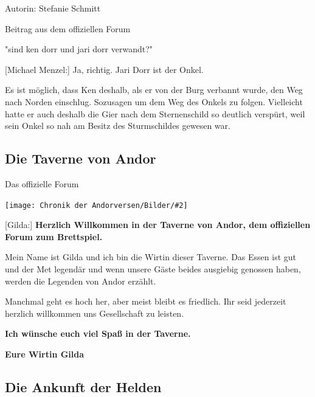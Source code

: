 \documentclass[10pt, a4paper, oneside]{book}
\newcommand{\produkt}[1]{%
    \section{#1}%
    \label{Produkt: #1}%
}
\newcommand{\bildmitts}[2][height=0.32\textwidth,width=0.48\textwidth,keepaspectratio]{%
    \begin{center}
        \texttt{[image: Chronik der Andorversen/Bilder/\#2]}
    \end{center}
}
\newcommand{\bildlinks}[2][height=0.32\textwidth,width=0.48\textwidth,keepaspectratio]{%
    \begin{figure}
        \texttt{[image: Chronik der Andorversen/Bilder/\#2]}
    \end{figure}
}
\begin{document}
\begin{multicols}{2}
Autorin: Stefanie Schmitt


\begin{center}
    Beitrag aus dem offiziellen Forum

    "sind ken dorr und jari dorr verwandt?"
\end{center}

[Michael Menzel:] Ja, richtig. Jari Dorr ist der Onkel.

Es ist möglich, dass Ken deshalb, als er von der Burg verbannt wurde, den Weg nach Norden einschlug. Sozusagen um dem Weg des Onkels zu folgen. Vielleicht hatte er auch deshalb die Gier nach dem Sternenschild so deutlich verspürt, weil sein Onkel so nah am Besitz des Sturmschildes gewesen war.





\produkt{Die Taverne von Andor}

\begin{center}
    Das offizielle Forum
\end{center}

\bildmitts{Die Taverne von Andor.jpg}


[Gilda:] \textbf{Herzlich Willkommen in der Taverne von Andor, dem offiziellen Forum zum Brettspiel.}

Mein Name ist Gilda und ich bin die Wirtin dieser Taverne. Das Essen ist gut und der Met legendär und wenn unsere Gäste beides ausgiebig genossen haben, werden die Legenden von Andor erzählt.

Manchmal geht es hoch her, aber meist bleibt es friedlich. Ihr seid jederzeit herzlich willkommen uns Gesellschaft zu leisten.

\textbf{Ich wünsche euch viel Spaß in der Taverne.}

\textbf{Eure Wirtin Gilda}























\begin{chapterbox}

    \chapter{Die Ankunft der Helden}
    

\end{chapterbox}
\end{multicols}
\end{document}
